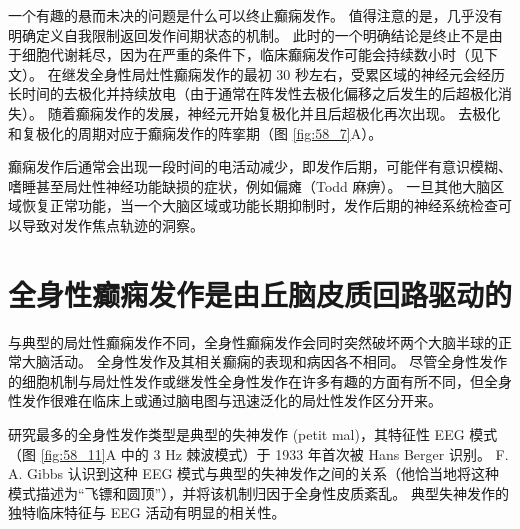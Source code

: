 一个有趣的悬而未决的问题是什么可以终止癫痫发作。
值得注意的是，几乎没有明确定义自我限制返回发作间期状态的机制。
此时的一个明确结论是终止不是由于细胞代谢耗尽，因为在严重的条件下，临床癫痫发作可能会持续数小时（见下文）。
在继发全身性局灶性癫痫发作的最初 30 秒左右，受累区域的神经元会经历长时间的去极化并持续放电（由于通常在阵发性去极化偏移之后发生的后超极化消失）。
随着癫痫发作的发展，神经元开始复极化并且后超极化再次出现。
去极化和复极化的周期对应于癫痫发作的阵挛期（图 \ref{fig:58_7}A）。


癫痫发作后通常会出现一段时间的电活动减少，即发作后期，可能伴有意识模糊、嗜睡甚至局灶性神经功能缺损的症状，例如偏瘫（Todd 麻痹）。
一旦其他大脑区域恢复正常功能，当一个大脑区域或功能长期抑制时，发作后期的神经系统检查可以导致对发作焦点轨迹的洞察。



\section{全身性癫痫发作是由丘脑皮质回路驱动的}

与典型的局灶性癫痫发作不同，全身性癫痫发作会同时突然破坏两个大脑半球的正常大脑活动。
全身性发作及其相关癫痫的表现和病因各不相同。
尽管全身性发作的细胞机制与局灶性发作或继发性全身性发作在许多有趣的方面有所不同，但全身性发作很难在临床上或通过脑电图与迅速泛化的局灶性发作区分开来。


研究最多的全身性发作类型是典型的失神发作 (petit mal)，其特征性 EEG 模式（图 \ref{fig:58_11}A 中的 3 Hz 棘波模式）于 1933 年首次被 Hans Berger 识别。
F. A. Gibbs 认识到这种 EEG 模式与典型的失神发作之间的关系（他恰当地将这种模式描述为“飞镖和圆顶”），并将该机制归因于全身性皮质紊乱。
典型失神发作的独特临床特征与 EEG 活动有明显的相关性。



